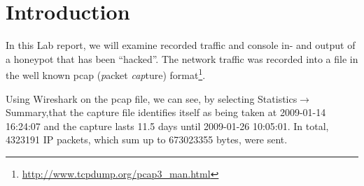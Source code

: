 \documentclass[a4paper,
    11pt,
    normalheadings,
    parindent,
    UKenglish,
    abstracton,
    ]{scrartcl}
\title{\mytitle{}}
\author{
    cand. Dipl. Inf. Tobias Müller <\href{mailto:muellet2@computing.dcu.ie?subject=ss10-forensic-lab01}{muellet2@}>, 59212333 \and
    BSc. Anthony Walters <\href{mailto:waltera3@computing.dcu.ie?subject=ss10-forensic-lab01}{waltera3@}>, 59213102 \and Conor Lynch <\href{mailto:conor.lynch36@mail.dcu.ie}{lynchc36@}>, 55619599}
\date{\today}
\begin{document}
\maketitle


\section{Introduction}
In this Lab report, we will examine recorded traffic and console in- and output of a honeypot that has been ``hacked''.
The network traffic was recorded into a file in the well known pcap (\emph{p}acket \emph{cap}ture) format\footnote{\url{http://www.tcpdump.org/pcap3_man.html}}.

Using Wireshark on the pcap file, we can see, by selecting Statistics$\rightarrow$Summary,that the capture file identifies itself as being taken at 2009-01-14 16:24:07 and the capture lasts 11.5 days until 2009-01-26 10:05:01.
In total, 4323191 IP packets, which sum up to 673023355 bytes,   were sent.
\end{document}
